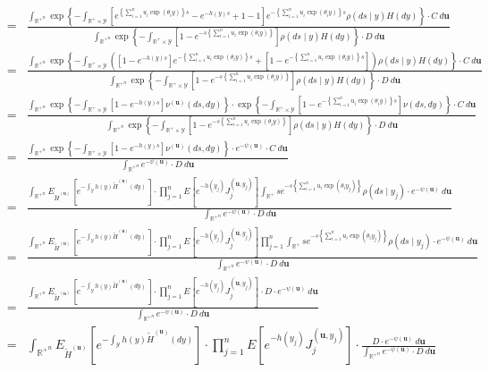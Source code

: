 \documentclass[10pt, oneside]{article}   	%
\renewcommand{\th}{\theta}
\newcommand{\thh}{\widetilde{H}}
\newcommand{\sy}{\mathcal{Y}}
\newcommand{\R}{\mathbb{R}}
\renewcommand{\sy}{\mathcal{Y}}
\newcommand{\ub}{\mathbf{u}}
\begin{document}
\begin{eqnarray*}
        & = & \frac{\int_{{\R^{+}}^n}  \exp \left \{ - \int_{\R^{+} \times \sy} \left[e^{\left\{\sum_{i=1}^n u_i \exp(\th_i y) \right\} s} - e^{- h(y) s} + 1 - 1 \right] e^{- \left\{\sum_{i=1}^n u_i \exp(\th_i y) \right\} s}\rho(ds \mid y) H(dy) \right\} \cdot C  \ d \ub }{\int_{{\R^{+}}^n}   \exp \left \{ - \int_{\R^{+} \times \sy} \left[1 - e^{- s \left\{\sum_{i=1}^n u_i \exp(\th_i y) \right\}} \right] \rho(ds \mid y) H(dy) \right\}  \cdot  D \ d \ub} \\
       & = & \frac{\int_{{\R^{+}}^n}  \exp \left \{ - \int_{\R^{+} \times \sy} \left(\left[1 - e^{- h(y) s} \right] e^{- \left\{\sum_{i=1}^n u_i \exp(\th_i y) \right\} s} + \left[1 - e^{- \left\{\sum_{i=1}^n u_i \exp(\th_i y) \right\} s} \right]\right)\rho(ds \mid y) H(dy) \right\} \cdot C  \ d \ub }{\int_{{\R^{+}}^n}   \exp \left \{ - \int_{\R^{+} \times \sy} \left[1 - e^{- s \left\{\sum_{i=1}^n u_i \exp(\th_i y) \right\}} \right] \rho(ds \mid y) H(dy) \right\}  \cdot  D \ d \ub} \\
          & = & \frac{\int_{{\R^{+}}^n}  \exp \left \{ - \int_{\R^{+} \times \sy} \left[1 - e^{- h(y) s} \right] \nu^{(\ub)} (ds, dy) \right\} \cdot  \exp \left \{ - \int_{\R^{+} \times \sy}  \left[1 - e^{- \left\{\sum_{i=1}^n u_i \exp(\th_i y) \right\} s} \right] \nu(ds, dy) \right\} \cdot C  \ d \ub }{\int_{{\R^{+}}^n}   \exp \left \{ - \int_{\R^{+} \times \sy} \left[1 - e^{- s \left\{\sum_{i=1}^n u_i \exp(\th_i y) \right\}} \right] \rho(ds \mid y) H(dy) \right\}  \cdot  D \ d \ub} \\
           & = & \frac{\int_{{\R^{+}}^n}  \exp \left \{ - \int_{\R^{+} \times \sy} \left[1 - e^{- h(y) s} \right] \nu^{(\ub)} (ds, dy) \right\} \cdot  e^{-\psi(\ub)} \cdot C  \ d \ub }{\int_{{\R^{+}}^n}   e^{-\psi(\ub)}  \cdot  D \ d \ub} \\
             & = & \frac{\int_{{\R^{+}}^n} E_{\thh^{(\ub)}}\left[e^{-\int_\sy h(y) \thh^{(\ub)}(dy)}\right] \cdot \prod_{j=1}^n E\left[e^{-h(y_j)} J^{(\ub, y_j)}_j \right] \int_{\R^{+}} s e^{-s \left\{\sum_{i=1}^n u_i \exp(\th_i y_j)\right\}} \rho(ds \mid y_j) \cdot  e^{-\psi(\ub)}  \ d \ub }{\int_{{\R^{+}}^n}   e^{-\psi(\ub)}  \cdot  D \ d \ub} \\
             & = & \frac{\int_{{\R^{+}}^n} E_{\thh^{(\ub)}}\left[e^{-\int_\sy h(y) \thh^{(\ub)}(dy)}\right] \cdot \prod_{j=1}^n E\left[e^{-h(y_j)} J^{(\ub, y_j)}_j \right] \prod_{j=1}^n \int_{\R^{+}} s e^{-s \left\{\sum_{i=1}^n u_i \exp(\th_i y_j)\right\}} \rho(ds \mid y_j)  \cdot  e^{-\psi(\ub)}  \ d \ub }{\int_{{\R^{+}}^n}   e^{-\psi(\ub)}  \cdot  D \ d \ub} \\
             & = & \frac{\int_{{\R^{+}}^n} E_{\thh^{(\ub)}}\left[e^{-\int_\sy h(y) \thh^{(\ub)}(dy)}\right] \cdot \prod_{j=1}^n E\left[e^{-h(y_j)} J^{(\ub, y_j)}_j \right] \cdot D  \cdot  e^{-\psi(\ub)}  \ d \ub }{\int_{{\R^{+}}^n}   e^{-\psi(\ub)}  \cdot  D \ d \ub} \\
                 & = &  \int_{{\R^{+}}^n} E_{\thh^{(\ub)}}\left[e^{-\int_\sy h(y) \thh^{(\ub)}(dy)}\right] \cdot \prod_{j=1}^n E\left[e^{-h(y_j)} J^{(\ub, y_j)}_j \right] \cdot \frac{ D  \cdot  e^{-\psi(\ub)} \ d \ub }{\int_{{\R^{+}}^n}   e^{-\psi(\ub)}  \cdot  D \ d \ub} \\
\end{eqnarray*}
\end{document}
